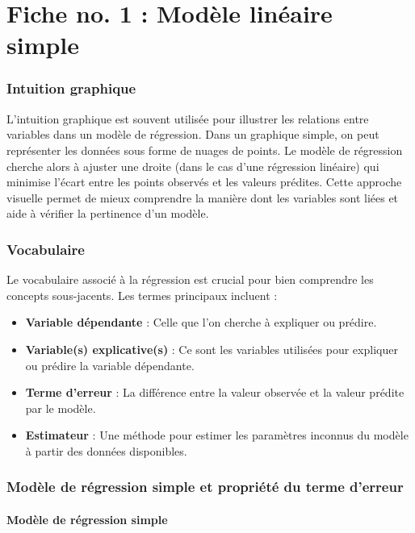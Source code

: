 \documentclass[a4paper,12pt]{article}
\begin{document}
	
	\part*{Fiche no. 1 : Modèle linéaire simple}
	
	\section{Intuition graphique}
	
	L’intuition graphique est souvent utilisée pour illustrer les relations entre variables dans un modèle de régression. Dans un graphique simple, on peut représenter les données sous forme de nuages de points. Le modèle de régression cherche alors à ajuster une droite (dans le cas d'une régression linéaire) qui minimise l'écart entre les points observés et les valeurs prédites. Cette approche visuelle permet de mieux comprendre la manière dont les variables sont liées et aide à vérifier la pertinence d’un modèle.
	
	\section{Vocabulaire}
	
	Le vocabulaire associé à la régression est crucial pour bien comprendre les concepts sous-jacents. Les termes principaux incluent :
	\begin{itemize}
		\item \textbf{Variable dépendante} : Celle que l'on cherche à expliquer ou prédire.
		\item \textbf{Variable(s) explicative(s)} : Ce sont les variables utilisées pour expliquer ou prédire la variable dépendante.
		\item \textbf{Terme d'erreur} : La différence entre la valeur observée et la valeur prédite par le modèle.
		\item \textbf{Estimateur} : Une méthode pour estimer les paramètres inconnus du modèle à partir des données disponibles.
	\end{itemize}
	
	\section{Modèle de régression simple et propriété du terme d'erreur}
	
	\subsection{Modèle de régression simple}
	
\end{document}
